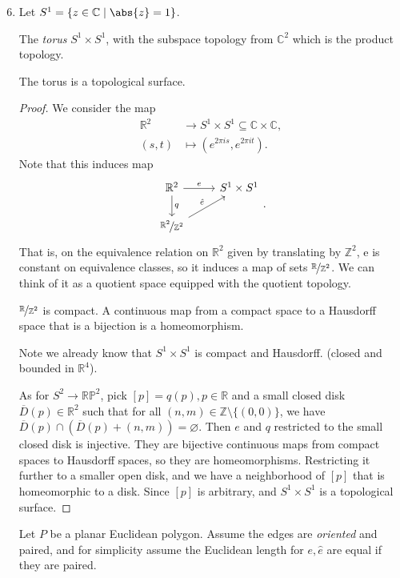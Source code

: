 \begin{enumerate}
    \setcounter{enumi}{5}
    \item Let \(S^1 = \{z \in \mathbb{C}\mid \abs{z} =1\}\).
    
    The \textit{torus} \(S^1 \times S^1\), with the subspace topology from \(\mathbb{C}^2\) which is the product topology.
    \begin{lemma}{}{}
        The torus is a topological surface.
    \end{lemma}
    \begin{proof}
        We consider the map
        \begin{align*}
            \mathbb{R}^2 &\to S^1 \times S^1 \subseteq \mathbb{C}\times \mathbb{C},\\
            (s,t) &\mapsto (e^{2\pi is},e^{2\pi it}).
        \end{align*}
        Note that this induces map
        \[
            \begin{tikzcd}
                \mathbb{R}^2 \arrow[d,"q"] \arrow[r, "e"] & S^1\times S^1 \\ \nicefrac{\mathbb{R}^2}{\mathbb{Z}^2} \arrow[ru, "\hat{e}"]& 
            \end{tikzcd}.
        \]
        That is, on the equivalence relation on \(\mathbb{R}^2\) given by translating by \(\mathbb{Z}^2\), e is constant on equivalence classes, so it induces a map of sets \(\nicefrac{\mathbb{R}}{\mathbb{Z}^2}\). We can think of it as a quotient space equipped with the quotient topology.

        \(\nicefrac{\mathbb{R}}{\mathbb{Z}^2}\) is compact. A continuous map from a compact space to a Hausdorff space that is a bijection is a homeomorphism.

        Note we already know that \(S^1 \times S^1\) is compact and Hausdorff. (closed and bounded in \(\mathbb{R}^4\)).

        As for \(S^2 \to \mathbb{RP}^2\), pick \([p] = q(p), p \in \mathbb{R}\) and a small closed disk \(\overline{D}(p)\in \mathbb{R}^2\) such that for all \((n,m)\in \mathbb{Z}\setminus \{(0,0)\}\), we have \(\overline{D}(p)\cap (\overline{D}(p) + (n,m))=\varnothing \). Then \(e\) and \(q\) restricted to the small closed disk is injective. They are bijective continuous maps from compact spaces to Hausdorff spaces, so they are homeomorphisms. Restricting it further to a smaller open disk, and we have a neighborhood of \([p]\) that is homeomorphic to a disk. Since \([p]\) is arbitrary, and \(S^1 \times S^1\) is a topological surface.
    \end{proof}
    Let \(P\) be a planar Euclidean polygon. Assume the edges are \textit{oriented} and paired, and for simplicity assume the Euclidean length for \(e, \hat{e}\) are equal if they are paired.


\end{enumerate}
